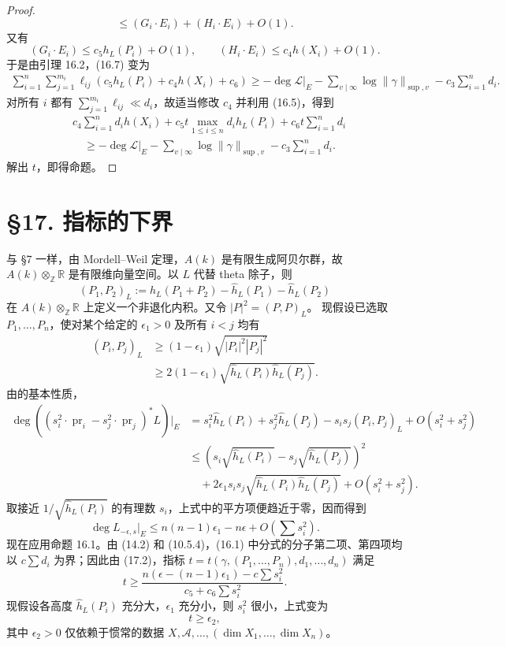 \begin{proof}
\[\le(G_i\cdot E_i)+(H_i\cdot E_i)+O(1).
\]
又有
\[
(G_i\cdot E_i)\le c_5h_L(P_i)+O(1),\qquad
(H_i\cdot E_i)\le c_4h(X_i)+O(1).
\]
于是由引理 16.2，(16.7) 变为
\begin{align*}
\sum_{i=1}^n\sum_{j=1}^{m_i}\ell_{ij}
(c_5h_L(P_i)+c_4h(X_i)+c_6)
\ge-\deg\mathscr L|_E-\sum_{v\mid\infty}\log\|\gamma\|_{\sup,v}-c_3\sum_{i=1}^n d_i.
\end{align*}
对所有 $i$ 都有 $\sum_{j=1}^{m_i}\ell_{ij}\ll d_i$，故适当修改 $c_4$ 并利用 (16.5)，得到
\begin{align*}
&c_4\sum_{i=1}^n d_i h(X_i)+c_5t\max_{1\le i\le n}d_i h_L(P_i)+c_6t\sum_{i=1}^n d_i\\
&\quad\ge-\deg\mathscr L|_E-\sum_{v\mid\infty}\log\|\gamma\|_{\sup,v}-c_3\sum_{i=1}^n d_i.
\end{align*}
解出 $t$，即得命题。
\end{proof}

\section*{§17. 指标的下界}
与 §7 一样，由 Mordell--Weil 定理，$A(k)$ 是有限生成阿贝尔群，故 $A(k)\otimes_{\mathbb Z}\mathbb R$ 是有限维向量空间。以 $L$ 代替 theta 除子，则
\[
(P_1,P_2)_L:=\hat h_L(P_1+P_2)-\hat h_L(P_1)-\hat h_L(P_2)
\]
在 $A(k)\otimes_{\mathbb Z}\mathbb R$ 上定义一个非退化内积。又令 $|P|^2=(P,P)_L$。
现假设已选取 $P_1,\ldots,P_n$，使对某个给定的 $\epsilon_1>0$ 及所有 $i<j$ 均有
\begin{align*}\tag{17.1}
(P_i,P_j)_L&\ge(1-\epsilon_1)\sqrt{|P_i|^2|P_j|^2}\\
&\ge2(1-\epsilon_1)\sqrt{\hat h_L(P_i)\hat h_L(P_j)}.
\end{align*}
由的基本性质，
\begin{align*}
\deg((s_i^2\cdot\operatorname{pr}_i-s_j^2\cdot\operatorname{pr}_j)^*L)|_E
&=s_i^2\hat h_L(P_i)+s_j^2\hat h_L(P_j)-s_is_j(P_i,P_j)_L+O(s_i^2+s_j^2)\\
&\le\left(s_i\sqrt{\hat h_L(P_i)}-s_j\sqrt{\hat h_L(P_j)}\right)^2\\
&\quad+2\epsilon_1s_is_j\sqrt{\hat h_L(P_i)\hat h_L(P_j)}+O(s_i^2+s_j^2).
\end{align*}
取接近 $1/\sqrt{\hat h_L(P_i)}$ 的有理数 $s_i$，上式中的平方项便趋近于零，因而得到
\begin{equation*}\tag{17.2}
\deg L_{-\epsilon,s}|_E\le n(n-1)\epsilon_1-n\epsilon+O\!\left(\sum s_i^2\right).
\end{equation*}
现在应用命题 16.1。由 (14.2) 和 (10.5.4)，(16.1) 中分式的分子第二项、第四项均以 $c\sum d_i$ 为界；因此由 (17.2)，指标 $t=t(\gamma,(P_1,\ldots,P_n),d_1,\ldots,d_n)$ 满足
\[
t\ge\frac{n(\epsilon-(n-1)\epsilon_1)-c\sum s_i^2}{c_5+c_6\sum s_i^2}.
\]
现假设各高度 $\hat h_L(P_i)$ 充分大，$\epsilon_1$ 充分小，则 $s_i^2$ 很小，上式变为
\begin{equation*}\tag{17.3}
t\ge\epsilon_2,
\end{equation*}
其中 $\epsilon_2>0$ 仅依赖于惯常的数据 $X,\mathscr A,\ldots,(\dim X_1,\ldots,\dim X_n)$。

